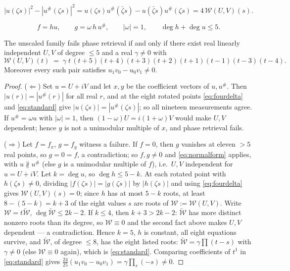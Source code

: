 \documentclass[10pt,a4paper]{amsart}
\begin{document}
\begin{equation}\label{eq:fourdelta}
|u(\zeta s)|^2-|u^{\#}(\zeta s)|^2
=u(\zeta s)u^{\#}(\bar\zeta s)-u(\bar\zeta s)u^{\#}(\zeta s)
=4\,\mathcal W(U,V)(s).
\end{equation}

\begin{equation}\label{eq:normalform}
f=hu,\qquad g=\omega\,h\,u^{\#},\qquad|\omega|=1,\qquad \deg h+\deg
u\le5 .
\end{equation}

\begin{proposition}\label{prop:reduction}
The unscaled family fails phase retrieval if and only if there exist
real linearly independent $U,V$ of degree $\le5$ and a real
$\gamma\neq0$ with
\begin{equation}\label{eq:standard}
\mathcal W(U,V)(t)\;=\;\gamma\;t\,(t+5)(t+4)(t+3)(t+2)(t+1)(t-1)(t-3)(t-4).
\end{equation}
Moreover every such pair satisfies $u_1v_0-u_0v_1\neq0$.
\end{proposition}

\begin{proof}
($\Leftarrow$) Set $u=U+iV$ and let $x,y$ be the coefficient vectors
of $u,u^{\#}$. Then $|u(r)|=|u^{\#}(r)|$ for all real $r$, and at the
eight rotated points \eqref{eq:fourdelta} and \eqref{eq:standard} give
$|u(\zeta s)|=|u^{\#}(\zeta s)|$; so all nineteen measurements agree.
If $u^{\#}=\omega u$ with $|\omega|=1$, then $(1-\omega)U=i(1+\omega)V$
would make $U,V$ dependent; hence $y$ is not a unimodular multiple of
$x$, and phase retrieval fails.

($\Rightarrow$) Let $f=f_x$, $g=f_y$ witness a failure. If $f=0$, then
$g$ vanishes at eleven $>5$ real points, so $g=0=f$, a contradiction;
so $f,g\neq0$ and \eqref{eq:normalform} applies, with
$u\not\parallel u^{\#}$ (else $g$ is a unimodular multiple of $f$),
i.e.\ $U,V$ independent for $u=U+iV$. Let $k=\deg u$, so $\deg
h\le5-k$. At each rotated point with $h(\zeta s)\neq0$, dividing
$|f(\zeta s)|=|g(\zeta s)|$ by $|h(\zeta s)|$ and using
\eqref{eq:fourdelta} gives $\mathcal W(U,V)(s)=0$; since $h$ has at
most $5-k$ roots, at least $8-(5-k)=k+3$ of the eight values $s$ are
roots of $\mathcal W:=\mathcal W(U,V)$. Write $\mathcal
W=t\widetilde{\mathcal W}$, $\deg\widetilde{\mathcal W}\le2k-2$. If
$k\le4$, then $k+3>2k-2$: $\widetilde{\mathcal W}$ has more distinct
nonzero roots than its degree, so $\mathcal W\equiv0$ and the second
fact above makes $U,V$ dependent --- a contradiction. Hence $k=5$, $h$
is constant, all eight equations survive, and $\widetilde{\mathcal
W}$, of degree $\le8$, has the eight listed roots:
$\widetilde{\mathcal W}=\gamma\prod(t-s)$ with $\gamma\neq0$ (else
$\mathcal W\equiv0$ again), which is \eqref{eq:standard}. Comparing
coefficients of $t^1$ in \eqref{eq:standard} gives
$\tfrac{24}{25}(u_1v_0-u_0v_1)=\gamma\prod_s(-s)\neq0$.
\end{proof}
\end{document}
